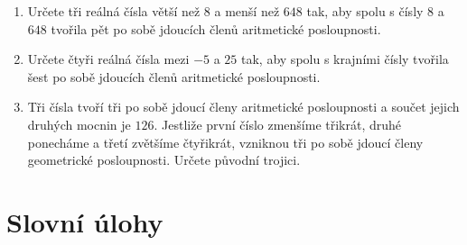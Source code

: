 \documentclass[11pt,a4paper]{article}
\begin{document}
\begin{enumerate}[resume]
    \item Určete tři reálná čísla větší než $8$ a menší než $648$ tak, aby spolu s čísly $8$ a $648$ tvořila pět po sobě jdoucích členů aritmetické posloupnosti.

    \item Určete čtyři reálná čísla mezi $-5$ a $25$ tak, aby spolu s krajními čísly tvořila šest po sobě jdoucích členů aritmetické posloupnosti.

    \item Tři čísla tvoří tři po sobě jdoucí členy aritmetické posloupnosti a součet jejich druhých mocnin je $126$. Jestliže první číslo zmenšíme třikrát, druhé ponecháme a třetí zvětšíme čtyřikrát, vzniknou tři po sobě jdoucí členy geometrické posloupnosti. Určete původní trojici.
\end{enumerate}

\section*{Slovní úlohy}
\end{document}
